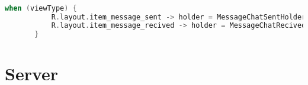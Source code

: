 \begin{lstlisting}[language=kotlin,caption={FragmentTodo.kt}]

when (viewType) {
           R.layout.item_message_sent -> holder = MessageChatSentHolder(itemView = view, dateOfLastMessage = lastItem?.timestamp)
           R.layout.item_message_recived -> holder = MessageChatRecivedHolder(itemView = view, dateOfLastMessage = lastItem?.timestamp)
       }
   \end{lstlisting}




















\section{Server}                 %
